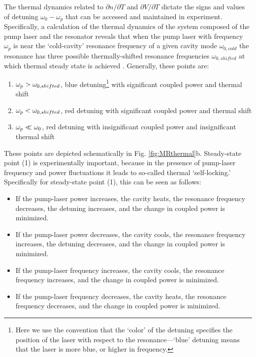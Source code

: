 The thermal dynamics related to $\partial n/\partial T$ and $\partial V/\partial T$ dictate the signs and values of detuning $\omega_0-\omega_p$ that can be accessed and maintained in experiment. Specifically, a calculation of the thermal dynamics of the system composed of the pump laser and the resonator reveals that when the pump laser with frequency $\omega_p$ is near the `cold-cavity' resonance frequency of a given cavity mode $\omega_{0,cold}$ the resonance has three possible thermally-shifted resonance frequencies $\omega_{0,shifted}$ at which thermal steady state is achieved \cite{Carmon2004}. Generally, these points are:
\begin{enumerate}
\item $\omega_{p}>\omega_{0,shifted}$, blue detuning\footnote{Here we use the convention that the `color' of the detuning specifies the position of the laser with respect to the resonance---`blue' detuning means that the laser is more blue, or higher in frequency.} with significant coupled power and thermal shift
\item $\omega_{p}<\omega_{0,shifted}$, red detuning with significant coupled power and thermal shift
\item $\omega_{p}\ll\omega_{0}$, red detuning with insignificant coupled power and insignificant thermal shift
\end{enumerate}
These points are depicted schematically in Fig. \ref{fig:MRthermal}b. Steady-state point (1) is experimentally important, because in the presence of pump-laser frequency and power fluctuations it leads to so-called thermal `self-locking.' Specifically for steady-state point (1), this can be seen as follows: 
\begin{itemize}
	\item If the pump-laser power increases, the cavity heats, the resonance frequency decreases, the detuning increases, and the change in coupled power is minimized.
	\item If the pump-laser power decreases, the cavity cools, the resonance frequency increases, the detuning decreases, and the change in coupled power is minimized.
	\item If the pump-laser frequency increases, the cavity cools, the resonance frequency increases, and the change in coupled power is minimized.
	\item If the pump-laser frequency decreases, the cavity heats, the resonance frequency decreases, and the change in coupled power is minimized.
	\end{itemize}
